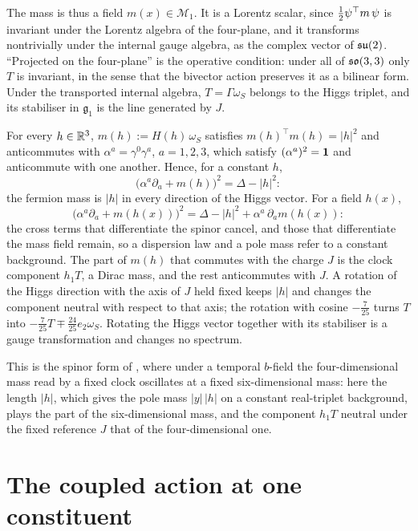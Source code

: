 The mass is thus a field $m(x)\in\mathcal M_1$. It is a Lorentz scalar, since $\tfrac12\psi^\top m\,\psi$ is invariant under the Lorentz
algebra of the four-plane, and it transforms nontrivially under the internal gauge algebra, as the complex vector of $\mathfrak{su}(2)$. ``Projected on
the four-plane'' is the operative condition: under all of $\mathfrak{so}(3,3)$ only $T$ is invariant, in the sense that the bivector action preserves
it as a bilinear form. Under the transported internal algebra, $T=\Gamma\omega_S$ belongs to the Higgs triplet, and its stabiliser in
$\mathfrak g_1$ is the line generated by $J$.

\begin{proposition}
\label{prop:massread}
For every $h\in\mathbb{R}^3$, $m(h):=H(h)\,\omega_S$ satisfies $m(h)^\top m(h)=|h|^2$ and anticommutes with $\alpha^a=\gamma^0\gamma^a$, $a=1,2,3$,
which satisfy $(\alpha^a)^2=\mathbf 1$ and anticommute with one another. Hence, for a constant $h$,
\[
\bigl(\alpha^a\partial_a+m(h)\bigr)^2=\Delta-|h|^2 :
\]
the fermion mass is $|h|$ in every direction of the Higgs vector. For a field $h(x)$,
\[
\bigl(\alpha^a\partial_a+m(h(x))\bigr)^2=\Delta-|h|^2+\alpha^a\,\partial_am(h(x)) :
\]
the cross terms that differentiate the spinor cancel, and those that differentiate the mass field remain, so a dispersion law and a pole mass
refer to a constant background. The part of $m(h)$ that commutes with the charge $J$ is the clock component $h_1T$, a Dirac mass, and the
rest anticommutes with $J$. A rotation of the Higgs direction with the axis of $J$ held fixed keeps $|h|$ and changes the component neutral
with respect to that axis; the rotation with cosine $-\tfrac7{25}$ turns $T$ into $-\tfrac7{25}T\mp\tfrac{24}{25}e_2\omega_S$. Rotating the
Higgs vector together with its stabiliser is a gauge transformation and changes no spectrum.
\end{proposition}

This is the spinor form of , where under a temporal $b$-field the four-dimensional mass read by a fixed clock oscillates at a
fixed six-dimensional mass: here the length $|h|$, which gives the pole mass $|y|\,|h|$ on a constant real-triplet background, plays the
part of the six-dimensional mass, and the component $h_1T$ neutral under the fixed reference $J$ that of the four-dimensional one.

\section{The coupled action at one constituent}
\label{sec:coupled}

